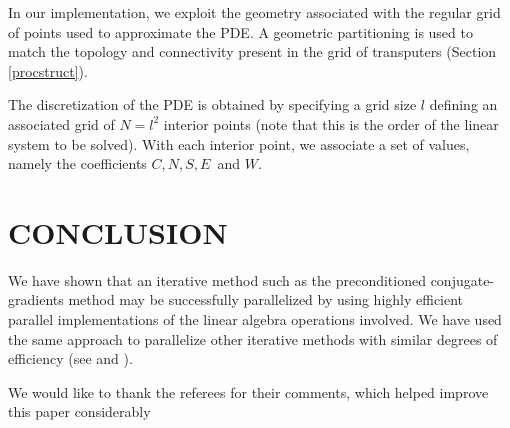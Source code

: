 \documentclass{ecai2012}
\begin{document}
In our implementation, we exploit the geometry associated with the
regular grid of points used to approximate the PDE. A geometric
partitioning is used to match the topology and connectivity present in
the grid of transputers (Section \ref{procstruct}).

The discretization of the PDE is obtained by specifying a grid size
$l$ defining an associated grid of $N=l^2$ interior points (note that
this is the order of the linear system to be solved). With each
interior point, we associate a set of values, namely the coefficients
$C, N, S, E\,$ and $W$.

\section{CONCLUSION}
We have shown that an iterative method such as the preconditioned
conjugate-gradients method may be successfully parallelized by using
highly efficient parallel implementations of the linear algebra
operations involved. We have used the same approach to parallelize
other iterative methods with similar degrees of efficiency (see
\cite{kn:daCunha92a} and \cite {kn:daCunha92b}).

\ack We would like to thank the referees for their comments, which
helped improve this paper considerably


\end{document}
